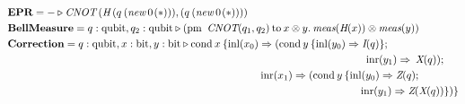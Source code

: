 \begin{align*}
  \hspace{-28pt} &\textbf{EPR} =  - \triangleright  \textit{CNOT} \hspace{2pt} (\textit{H}\hspace{2pt} (q  \hspace{2pt}    ( \textit{new}   \hspace{2pt}  0 \hspace{1pt}(*))),(q  \hspace{2pt}   ( \textit{new}   \hspace{2pt}  0 \hspace{1pt}(*))))  \\ 
      \hspace{-28pt}
      &\textbf{BellMeasure} =  q: \text{qubit}, q_{2}: \text{qubit}  \triangleright  (\text{pm}  \hspace{5pt} \textit{CNOT} (q_{1},q_{2})  \hspace{2pt}  \text{to} \hspace{2pt} x \otimes y.  \hspace{2pt}  \textit{meas} (\textit{H} (x)) \otimes \textit{meas} (y) ) \\
      \hspace{-28pt}
      &\textbf{Correction}= q: \text{qubit}, x: \text{bit},  y: \text{bit} \triangleright  \text{cond}\hspace{2pt} x  \hspace{2pt}  \{\text{inl} (x_{0}) \Rightarrow  (\text{cond}\hspace{2pt} y  \hspace{2pt}  \{\text{inl} (y_{0})  \Rightarrow{}  \textit{I}(q)\} ; \\
      \hspace{-28pt}
      & \hspace{335pt} \hspace{5pt} \text{inr} (y_{1}) \Rightarrow  \hspace{2pt}   \textit{X} (q)); \\
      & \hspace{240pt}\text{inr} (x_{1})  \Rightarrow  (\text{cond}\hspace{2pt} y  \hspace{2pt}  \{\text{inl} (y_{0})  \Rightarrow   \textit{Z}(q);  \\
      \hspace{-28pt}
      &\hspace{335pt} \text{inr} (y_{1}) \Rightarrow{} \textit{Z} (\textit{X}(q)) \})\}
 \end{align*}


